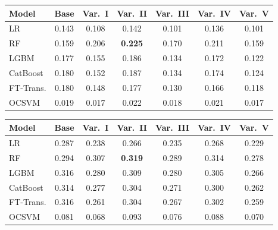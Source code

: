 \documentclass[a4paper,fleqn]{cas-sc}
\begin{document}
\noindent\begin{minipage}{\linewidth}\centering
{}
\label{tab:cd_prauc}
\begin{tabular}{l c c c c c c}
\toprule
Model & Base & Var.~I & Var.~II & Var.~III & Var.~IV & Var.~V \\
\midrule
LR          & 0.143 & 0.108 & 0.142 & 0.101 & 0.136 & 0.101 \\
RF          & 0.159 & 0.206 & \textbf{0.225} & 0.170 & 0.211 & 0.159 \\
LGBM        & 0.177 & 0.155 & 0.186 & 0.134 & 0.172 & 0.122 \\
CatBoost    & 0.180 & 0.152 & 0.187 & 0.134 & 0.174 & 0.124 \\
FT-Trans.   & 0.180 & 0.148 & 0.177 & 0.130 & 0.166 & 0.118 \\
OCSVM       & 0.019 & 0.017 & 0.022 & 0.018 & 0.021 & 0.017 \\
\bottomrule
\end{tabular}
\end{minipage}

\noindent\begin{minipage}{\linewidth}\centering
{}
\label{tab:cd_f2}
\begin{tabular}{l c c c c c c}
\toprule
Model & Base & Var.~I & Var.~II & Var.~III & Var.~IV & Var.~V \\
\midrule
LR          & 0.287 & 0.238 & 0.266 & 0.235 & 0.268 & 0.229 \\
RF          & 0.294 & 0.307 & \textbf{0.319} & 0.289 & 0.314 & 0.278 \\
LGBM        & 0.316 & 0.280 & 0.309 & 0.280 & 0.305 & 0.266 \\
CatBoost    & 0.314 & 0.277 & 0.304 & 0.271 & 0.300 & 0.262 \\
FT-Trans.   & 0.316 & 0.261 & 0.304 & 0.267 & 0.302 & 0.259 \\
OCSVM       & 0.081 & 0.068 & 0.093 & 0.076 & 0.088 & 0.070 \\
\bottomrule
\end{tabular}
\end{minipage}
\end{document}
